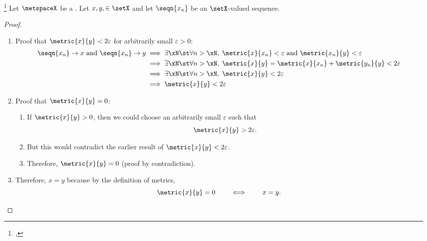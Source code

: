 \begin{theorem}
\footnote{
  ,
  }
\label{thm:xn_to_xy}
Let $\metspaceX$ be a .
Let $x,y,\in \setX$ and let $\seqn{x_n}$ be an $\setX$-valued sequence.
\end{theorem}
\begin{proof}
  \begin{enumerate}
    \item Proof that $\metric{x}{y} <2\varepsilon$ for arbitrarily small $\varepsilon>0$:
      \begin{align*}
        \seqn{x_n} \to x \text{ and }  \seqn{x_n} \to y
          &\implies \exists\xN \st \forall n>\xN,\;  \metric{x}{x_n}<\varepsilon \text{ and }  \metric{x_n}{y}<\varepsilon
        \\&\implies \exists\xN \st \forall n>\xN,\;  \metric{x}{y} = \metric{x}{x_n}+\metric{y_n}{y}<2\varepsilon 
        \\&\implies \exists\xN \st \forall n>\xN,\;  \metric{x}{y} <2\varepsilon 
        \\&\implies \metric{x}{y} <2\varepsilon 
      \end{align*}
  
    \item Proof that $\metric{x}{y}=0$:
      \begin{enumerate}
        \item If $\metric{x}{y}>0$, then we could choose an arbitrarily small $\varepsilon$ such that
          \[ \metric{x}{y} >2\varepsilon.\]
        \item But this would contradict the earlier result of $\metric{x}{y} <2\varepsilon$.
        \item Therefore, $\metric{x}{y}=0$ (proof by contradiction).
      \end{enumerate}
  
    \item Therefore, $x=y$ because by the definition of metrics, 
      \[ \metric{x}{y}=0 \qquad\iff\qquad x=y.\]
  
  \end{enumerate}
\end{proof}

